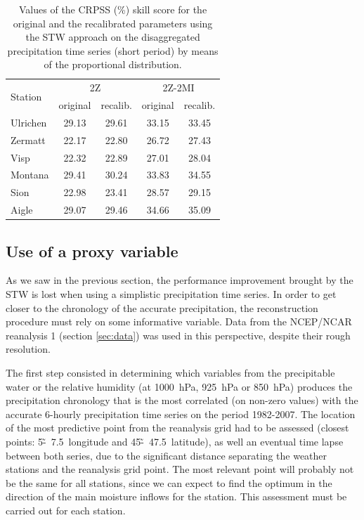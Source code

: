 \documentclass[hess]{copernicus}
\begin{document}
\begin{table}[htb]
	\caption{Values of the CRPSS (\%) skill score for the original and the recalibrated parameters using the STW approach on the disaggregated precipitation time series (short period) by means of the proportional distribution.}
	\begin{center}
		\begin{tabular}{l c c c c}
			\hline
			\multirow{2}{*}{Station} & \multicolumn{2}{c}{2Z} & \multicolumn{ 2}{c}{2Z-2MI} \\
			& original & recalib. & original & recalib. \\
			\hline
			Ulrichen & 29.13 & 29.61 & 33.15 & 33.45 \\
			Zermatt & 22.17 & 22.80 & 26.72 & 27.43 \\
			Visp & 22.32 & 22.89 & 27.01 & 28.04 \\
			Montana & 29.41 & 30.24 & 33.83 & 34.55 \\
			Sion & 22.98 & 23.41 & 28.57 & 29.15 \\
			Aigle & 29.07 & 29.46 & 34.66 & 35.09 \\
			\hline
		\end{tabular}
	\end{center}
	\label{table:disaggregation_proportional}
\end{table}


\subsection{Use of a proxy variable}

As we saw in the previous section, the performance improvement brought by the STW is lost when using a simplistic precipitation time series. In order to get closer to the chronology of the accurate precipitation, the reconstruction procedure must rely on some informative variable. Data from the NCEP/NCAR reanalysis 1 (section \ref{sec:data}) was used in this perspective, despite their rough resolution. 

The first step consisted in determining which variables from the precipitable water or the relative humidity (at 1000~hPa, 925~hPa or 850~hPa) produces the precipitation chronology that is the most correlated (on non-zero values) with the accurate 6-hourly precipitation time series on the period 1982-2007. The location of the most predictive point from the reanalysis grid had to be assessed (closest points: 5\textdegree\~-~7.5\textdegree\ longitude and 45\textdegree\~-~47.5\textdegree\ latitude), as well an eventual time lapse between both series, due to the significant distance separating the weather stations and the reanalysis grid point. The most relevant point will probably not be the same for all stations, since we can expect to find the optimum in the direction of the main moisture inflows for the station. This assessment must be carried out for each station. 
\end{document}
